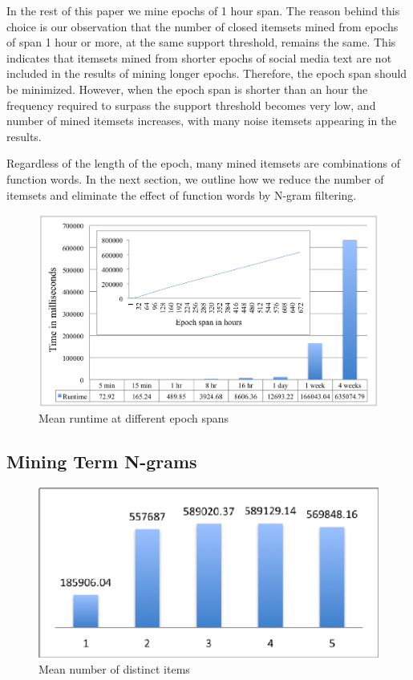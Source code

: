 \documentclass[letterpaper,12pt,titlepage,oneside,final]{book}
\begin{document}
In the rest of this paper we mine epochs of 1 hour span.
The reason behind this choice is our observation that the number of closed
itemsets mined from epochs of span 1 hour or more,
at the same support threshold, remains the same.
This indicates that itemsets mined from shorter epochs of social media text
are not included in the results of mining longer epochs. 
Therefore, the epoch span should be minimized.
However, when the epoch span is shorter than an hour the frequency required
to surpass the support threshold becomes very low,
and number of mined itemsets increases, with many noise itemsets appearing in
the results.

Regardless of the length of the epoch,
many mined itemsets are combinations of function words.
In the next section, we outline how we reduce the number of itemsets and
eliminate the effect of function words by N-gram filtering.

\begin{figure}
\centering

\includegraphics{runtim_epoch-spans_line-over-bars.png}
\caption{Mean runtime at different epoch spans}
\label{fig:runtimeEpochs}
\end{figure}

\subsection{Mining Term N-grams}
\label{sec:ngrams}



\begin{figure}
\centering
\includegraphics{perf_ngramlen1-5_distinct-items_supp10+_1hr.eps}
\caption{Mean number of distinct items}
\label{fig:ngramsLenA}
\end{figure}
\end{document}
